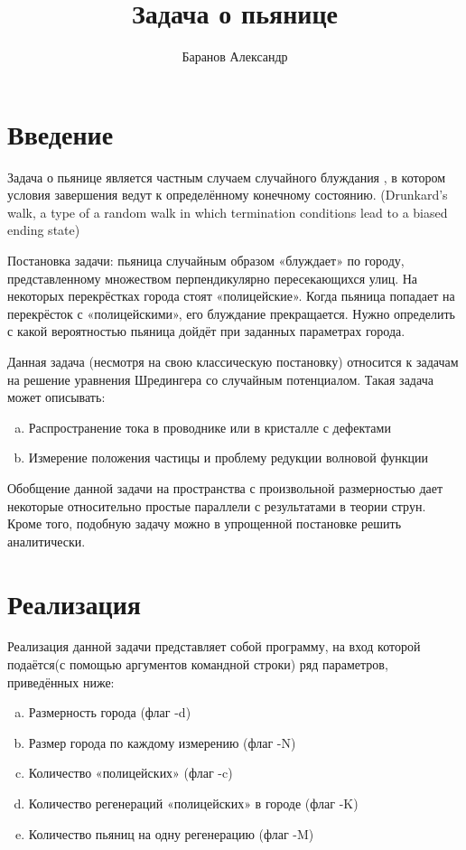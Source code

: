 \documentclass{article}
\title{Задача о пьянице}
\author{Баранов Александр}
\date{}
\begin{document}
 
    \pagestyle{empty} %
    \maketitle
    \pagebreak
    
    
        
    \section{Введение}
        Задача о пьянице является частным случаем случайного блуждания \cite{wiki}, в котором условия завершения ведут к определённому конечному состоянию. (Drunkard's walk, a type of a random walk in which termination conditions lead to a biased ending state)

        Постановка задачи: пьяница случайным образом «блуждает» по городу, представленному множеством перпендикулярно пересекающихся улиц. На некоторых перекрёстках города стоят «полицейские». Когда пьяница попадает на перекрёсток с «полицейскими», его блуждание прекращается. Нужно определить с какой вероятностью пьяница дойдёт при заданных параметрах города.

        Данная задача (несмотря на свою классическую постановку) относится к задачам на решение уравнения Шредингера со случайным потенциалом. Такая задача может описывать:
        \begin{enumerate}[a)]
            \item Распространение тока в проводнике или в кристалле с дефектами
            \item Измерение положения частицы и проблему редукции волновой функции
        \end{enumerate}

        Обобщение данной задачи на пространства с произвольной размерностью дает некоторые относительно простые параллели с результатами в теории струн. Кроме того, подобную задачу можно в упрощенной постановке решить аналитически.

    \pagebreak


    \section{Реализация}



    Реализация данной задачи представляет собой программу, на вход которой подаётся(с помощью аргументов командной строки) ряд параметров, приведённых ниже:
    \begin{enumerate}[a)]
        \item Размерность города (флаг -d)
        \item Размер города по каждому измерению (флаг -N)
        \item Количество «полицейских» (флаг -c)
        \item Количество регенераций «полицейских» в городе (флаг -K)
        \item Количество пьяниц на одну регенерацию (флаг -M)
    \end{enumerate}
\end{document}
